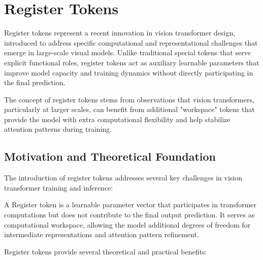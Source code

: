 
\section{Register Tokens}

Register tokens represent a recent innovation in vision transformer design, introduced to address specific computational and representational challenges that emerge in large-scale visual models. Unlike traditional special tokens that serve explicit functional roles, register tokens act as auxiliary learnable parameters that improve model capacity and training dynamics without directly participating in the final prediction.
\begin{comment}
Feedback: This is a good, technical introduction. To make it more intuitive, you could use an analogy. For example: "If a transformer layer is like a committee meeting, and the patch tokens are the members discussing the image, register tokens are like extra whiteboards in the room. They aren't members and don't get a final vote, but they provide a shared space where committee members can jot down intermediate thoughts, calculations, or summaries, leading to a more organized and effective discussion."
\end{comment}

The concept of register tokens stems from observations that vision transformers, particularly at larger scales, can benefit from additional "workspace" tokens that provide the model with extra computational flexibility and help stabilize attention patterns during training.

\subsection{Motivation and Theoretical Foundation}

The introduction of register tokens addresses several key challenges in vision transformer training and inference:

\begin{definition}
A Register token is a learnable parameter vector that participates in transformer computations but does not contribute to the final output prediction. It serves as computational workspace, allowing the model additional degrees of freedom for intermediate representations and attention pattern refinement.
\end{definition}

Register tokens provide several theoretical and practical benefits:

